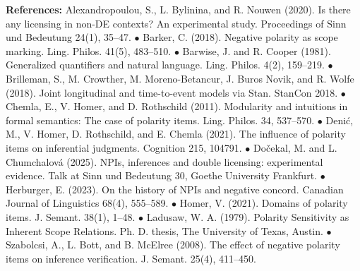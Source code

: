 \documentclass[12pt, a4]{article}
\begin{document}
\vspace{+5mm}
\noindent \small \textbf{References:} Alexandropoulou, S., L. Bylinina, and R. Nouwen (2020). Is there any licensing in non-DE contexts? An experimental study. Proceedings of Sinn und Bedeutung 24(1), 35–47. $\bullet$ Barker, C. (2018). Negative polarity as scope marking. Ling. Philos. 41(5), 483–510. $\bullet$ Barwise, J. and R. Cooper (1981). Generalized quantifiers and natural language. Ling. Philos. 4(2), 159–219. $\bullet$
Brilleman, S., M. Crowther, M. Moreno-Betancur, J. Buros Novik, and R. Wolfe (2018). Joint longitudinal and time-to-event models via Stan. StanCon 2018. $\bullet$
Chemla, E., V. Homer, and D. Rothschild (2011). Modularity and intuitions in formal semantics: The case of polarity items. Ling. Philos. 34, 537–570. $\bullet$
Denić, M., V. Homer, D. Rothschild, and E. Chemla (2021). The influence of polarity items on inferential judgments. Cognition 215, 104791. $\bullet$
Dočekal, M. and L. Chumchalová (2025). NPIs, inferences and double licensing: experimental evidence. Talk at Sinn und Bedeutung 30, Goethe University Frankfurt. $\bullet$
Herburger, E. (2023). On the history of NPIs and negative concord. Canadian Journal of Linguistics 68(4), 555–589. $\bullet$ 
Homer, V. (2021). Domains of polarity items. J. Semant. 38(1), 1–48. $\bullet$ 
Ladusaw, W. A. (1979). Polarity Sensitivity as Inherent Scope Relations. Ph. D. thesis, The University of Texas, Austin. $\bullet$
Szabolcsi, A., L. Bott, and B. McElree (2008). The effect of negative polarity items on inference verification. J. Semant. 25(4), 411–450.



\newpage



\end{document}
